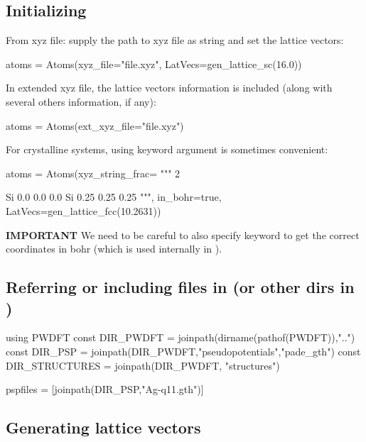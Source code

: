 \subsection*{Initializing }

From xyz file: supply the path to xyz file as string and
set the lattice vectors:

\begin{juliacode}
atoms = Atoms(xyz_file="file.xyz", LatVecs=gen_lattice_sc(16.0))
\end{juliacode}

In extended xyz file, the lattice vectors information is included
(along with several others information, if any):

\begin{juliacode}
atoms = Atoms(ext_xyz_file="file.xyz")
\end{juliacode}

For crystalline systems, using keyword argument 
is sometimes convenient:

\begin{juliacode}
atoms = Atoms(xyz_string_frac=
        """
        2

        Si  0.0  0.0  0.0
        Si  0.25  0.25  0.25
        """, in_bohr=true,
        LatVecs=gen_lattice_fcc(10.2631))
\end{juliacode}

\textbf{IMPORTANT} We need to be careful to also specify  keyword to get
the correct coordinates in bohr (which is used internally in ).



\subsection*{Referring or including files in  (or other dirs in )}

\begin{juliacode}
using PWDFT
const DIR_PWDFT = joinpath(dirname(pathof(PWDFT)),"..")
const DIR_PSP = joinpath(DIR_PWDFT,"pseudopotentials","pade_gth")
const DIR_STRUCTURES = joinpath(DIR_PWDFT, "structures")

pspfiles = [joinpath(DIR_PSP,"Ag-q11.gth")]
\end{juliacode}


\subsection*{Generating lattice vectors}

